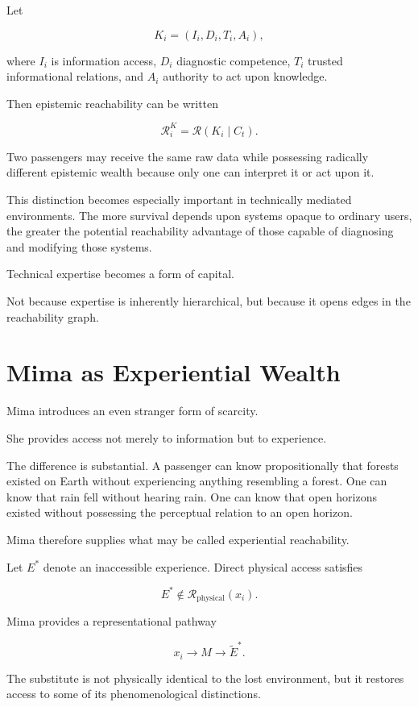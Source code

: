 \documentclass[11pt,oneside]{book}
\theoremstyle{definition}
\theoremstyle{remark}
\newcommand{\R}{\mathcal{R}}
\begin{document}
Let

\[
K_i
=
(I_i,D_i,T_i,A_i),
\]

where \(I_i\) is information access, \(D_i\) diagnostic competence, \(T_i\) trusted informational relations, and \(A_i\) authority to act upon knowledge.

Then epistemic reachability can be written

\[
\R_i^{K}
=
\R(K_i\mid C_t).
\]

Two passengers may receive the same raw data while possessing radically different epistemic wealth because only one can interpret it or act upon it.

This distinction becomes especially important in technically mediated environments. The more survival depends upon systems opaque to ordinary users, the greater the potential reachability advantage of those capable of diagnosing and modifying those systems.

Technical expertise becomes a form of capital.

Not because expertise is inherently hierarchical, but because it opens edges in the reachability graph.

\section{Mima as Experiential Wealth}

Mima introduces an even stranger form of scarcity.

She provides access not merely to information but to experience.

The difference is substantial. A passenger can know propositionally that forests existed on Earth without experiencing anything resembling a forest. One can know that rain fell without hearing rain. One can know that open horizons existed without possessing the perceptual relation to an open horizon.

Mima therefore supplies what may be called experiential reachability.

Let \(E^\ast\) denote an inaccessible experience. Direct physical access satisfies

\[
E^\ast\notin\R_{\mathrm{physical}}(x_i).
\]

Mima provides a representational pathway

\[
x_i
\rightarrow
M
\rightarrow
\widetilde E^\ast.
\]

The substitute is not physically identical to the lost environment, but it restores access to some of its phenomenological distinctions.
\end{document}
